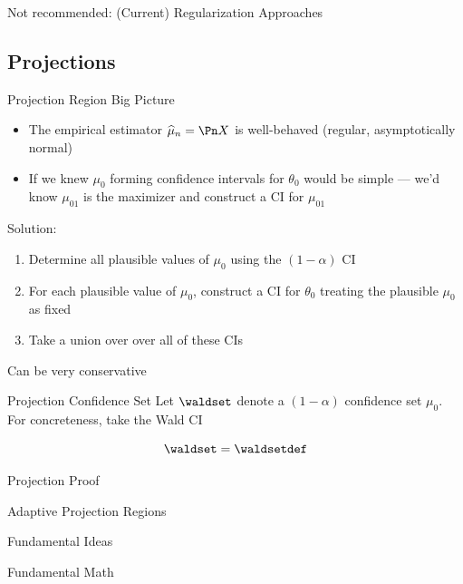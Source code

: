\documentclass[aspectratio=169, professionalfonts]{beamer}
\begin{document}
\begin{frame}{Not recommended: (Current) Regularization Approaches}
\end{frame}
\subsection{Projections}
\begin{frame}{Projection Region Big Picture}
	\begin{itemize}
		\item The empirical estimator $\widehat{\mu}_n = \Pn X$ is well-behaved (regular, asymptotically normal)
		      \vfill \pause
		\item If we knew $\mu_0$ forming confidence intervals for ${\theta}_0$
		      would be simple --- we'd know $\mu_{01}$ is the maximizer and
		      construct a CI for $\mu_{01}$
	\end{itemize}
	\vfill \pause
	Solution:
	\begin{enumerate}
		\item Determine all plausible values of $\mu_0$ using the $(1- \alpha)$ CI
		\item For each plausible value of $\mu_0$, construct a CI for ${\theta}_0$
		      treating the plausible $\mu_0$ as fixed
		\item Take a union over over all of these CIs
	\end{enumerate}
	\vfill \pause
	Can be very conservative

\end{frame}
\begin{frame}{Projection Confidence Set}
	Let $\waldset$ denote a $(1-\alpha)$ confidence set $\mu_0$. For concreteness, take
	the Wald CI

	$$\waldset = \waldsetdef$$

	\vfill \pause
\end{frame}
\begin{frame}{Projection Proof}
\end{frame}

\begin{frame}{Adaptive Projection Regions}
\end{frame}
\begin{frame}{Fundamental Ideas}
\end{frame}
\begin{frame}{Fundamental Math}
\end{frame}
\end{document}
